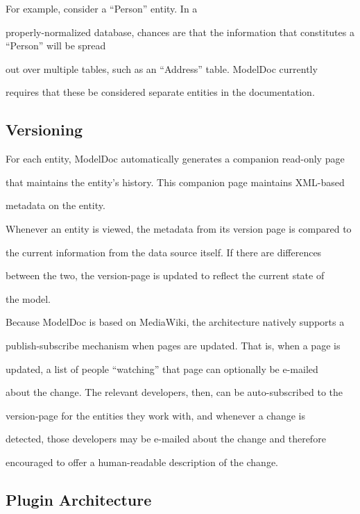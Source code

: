 \documentclass{acm_proc_article-sp}
\begin{document}
For example, consider a ``Person'' entity.  In a

properly-normalized database, chances are that the information that constitutes a ``Person'' will be spread

out over multiple tables, such as an ``Address'' table.  ModelDoc currently

requires that these be considered separate entities in the documentation.



\subsection{Versioning}



For each entity, ModelDoc automatically generates a companion read-only page

that maintains the entity's history.  This companion page maintains XML-based

metadata on the entity.



Whenever an entity is viewed, the metadata from its version page is compared to

the current information from the data source itself.  If there are differences

between the two, the version-page is updated to reflect the current state of

the model.



Because ModelDoc is based on MediaWiki, the architecture natively supports a

publish-subscribe mechanism when pages are updated.  That is, when a page is

updated, a list of people ``watching'' that page can optionally be e-mailed

about the change.  The relevant developers, then, can be auto-subscribed to the

version-page for the entities they work with, and whenever a change is

detected, those developers may be e-mailed about the change and therefore

encouraged to offer a human-readable description of the change.



\subsection{Plugin Architecture}
\end{document}
